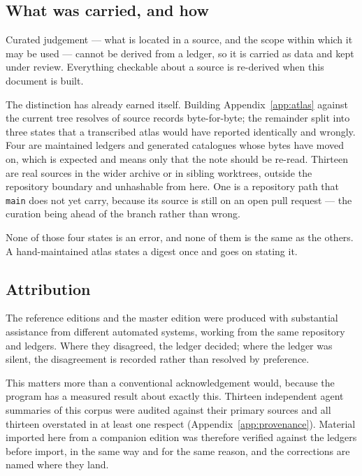 \subsection{What was carried, and how}

Curated judgement --- what is located in a source, and the scope within
which it may be used --- cannot be derived from a ledger, so it is
carried as data and kept under review. Everything checkable about a
source is re-derived when this document is built.

The distinction has already earned itself. Building
Appendix~\ref{app:atlas} against the current tree resolves
\AtlasVerified{} of \AtlasRecords{} source records byte-for-byte;
the remainder split into three states that a transcribed atlas would
have reported identically and wrongly. Four are maintained ledgers and
generated catalogues whose bytes have moved on, which is expected and
means only that the note should be re-read. Thirteen are real sources
in the wider archive or in sibling worktrees, outside the repository
boundary and unhashable from here. One is a repository path that
\texttt{main} does not yet carry, because its source is still on an
open pull request --- the curation being ahead of the branch rather
than wrong.

None of those four states is an error, and none of them is the same as
the others. A hand-maintained atlas states a digest once and goes on
stating it.

\subsection{Attribution}

The reference editions and the master edition were produced with
substantial assistance from different automated systems, working from
the same repository and ledgers. Where they disagreed, the ledger
decided; where the ledger was silent, the disagreement is recorded
rather than resolved by preference.

This matters more than a conventional acknowledgement would, because
the program has a measured result about exactly this. Thirteen
independent agent summaries of this corpus were audited against their
primary sources and all thirteen overstated in at least one respect
(Appendix~\ref{app:provenance}). Material imported here from a
companion edition was therefore verified against the ledgers before
import, in the same way and for the same reason, and the corrections
are named where they land.
